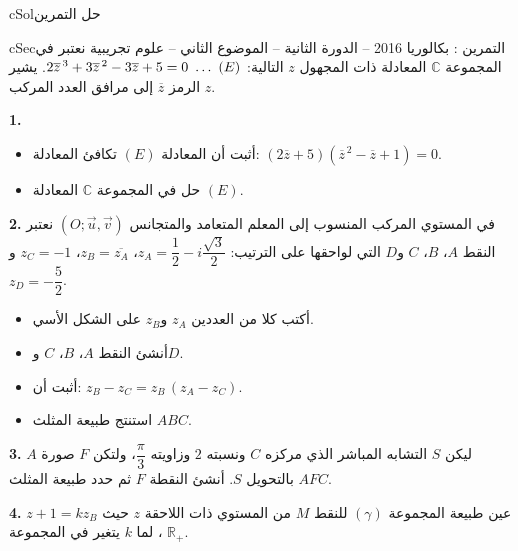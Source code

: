 \documentclass[12pt,a4paper]{article}
\newenvironment{BOX}[2]{\begin{otherlanguage}{english}\begin{arbox}{#1}{#2}}{\end{arbox}\end{otherlanguage}}
\newcounter{exo}
\newenvironment{tamrin}[1]{\stepcounter{exo}\begin{BOX}{cSec}{التمرين \theexo: #1}}{\end{BOX}}
\newenvironment{hal}{\Needspace{12\baselineskip}\begin{otherlanguage}{english}\begin{arbox}[breakable]{cSol}{حل التمرين \theexo}}{\end{arbox}\end{otherlanguage}}
\newenvironment{LTR}{\begin{otherlanguage}{english}}{\end{otherlanguage}}
\renewcommand{\ldots}{\mathinner{\ldotp\ldotp\ldotp}}
\newenvironment{sq}{\begin{itemize}[leftmargin=2.4em,itemsep=3pt]}{\end{itemize}}
\newcommand{\qa}{\item[(أ)]}\newcommand{\qb}{\item[(ب)]}\newcommand{\qc}{\item[(جـ)]}\newcommand{\qd}{\item[(د)]}\newcommand{\qe}{\item[(هـ)]}
\newcommand{\QQ}[1]{\par\smallskip\textbf{#1.} }
\begin{document}
\begin{hal}
\begin{center}\begin{LTR}\end{LTR}\end{center}
\end{hal}

\begin{tamrin}{بكالوريا 2016 -- الدورة الثانية -- الموضوع الثاني -- علوم تجريبية}
نعتبر في المجموعة $\mathbb{C}$ المعادلة ذات المجهول $z$ التالية: $2\overline{z}^{\,3}+3\overline{z}^{\,2}-3\overline{z}+5=0\ \ldots\ (E)$.
يشير الرمز $\overline{z}$ إلى مرافق العدد المركب $z$.
\QQ{1}
\begin{sq}
\qa أثبت أن المعادلة $(E)$ تكافئ المعادلة: $\left(2\overline{z}+5\right)\left(\overline{z}^{\,2}-\overline{z}+1\right)=0$.
\qb حل في المجموعة $\mathbb{C}$ المعادلة $(E)$.
\end{sq}
\QQ{2} في المستوي المركب المنسوب إلى المعلم المتعامد والمتجانس $(O;\vec u,\vec v)$ نعتبر النقط $A$، $B$، $C$ و$D$ التي لواحقها على الترتيب: $z_A=\dfrac12-i\dfrac{\sqrt3}{2}$، $z_B=\overline{z_A}$، $z_C=-1$ و$z_D=-\dfrac52$.
\begin{sq}
\qa أكتب كلا من العددين $z_A$ و$z_B$ على الشكل الأسي.
\qb أنشئ النقط $A$، $B$، $C$ و$D$.
\qc أثبت أن: $z_B-z_C=z_B\,(z_A-z_C)$.
\qd استنتج طبيعة المثلث $ABC$.
\end{sq}
\QQ{3} ليكن $S$ التشابه المباشر الذي مركزه $C$ ونسبته $2$ وزاويته $\dfrac{\pi}{3}$، ولتكن $F$ صورة $A$ بالتحويل $S$.
أنشئ النقطة $F$ ثم حدد طبيعة المثلث $AFC$.
\QQ{4} عين طبيعة المجموعة $(\gamma)$ للنقط $M$ من المستوي ذات اللاحقة $z$ حيث $z+1=kz_B$، لما $k$ يتغير في المجموعة $\mathbb{R}_+$.
\end{tamrin}
\end{document}
